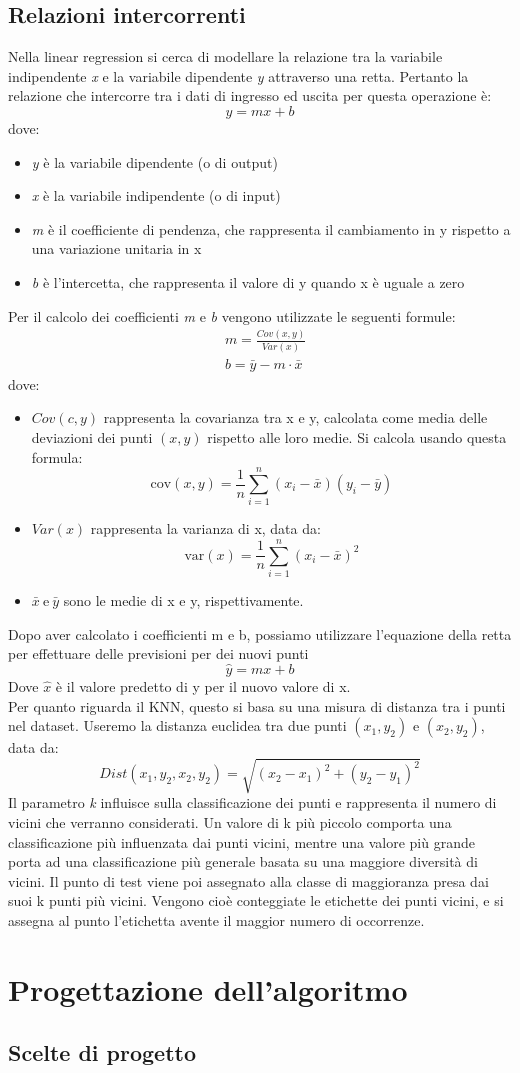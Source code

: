 \documentclass[11pt]{article}
\theoremstyle{definition}
\begin{document}
\subsection{Relazioni intercorrenti}
Nella linear regression si cerca di modellare la relazione tra la variabile indipendente \textit{x} e la variabile dipendente \textit{y} attraverso una retta. Pertanto la relazione che intercorre tra i dati di ingresso ed uscita per questa operazione è:
$$
y=mx+b
$$
dove:
\begin{itemize}
\item \textit{y} è la variabile dipendente (o di output)
\item \textit{x} è la variabile indipendente (o di input)
\item \textit{m} è il coefficiente di pendenza, che rappresenta il cambiamento in y rispetto a una variazione unitaria in x
\item \textit{b} è l'intercetta, che rappresenta il valore di y quando x è uguale a zero
\end{itemize}
Per il calcolo dei coefficienti \textit{m} e \textit{b} vengono utilizzate le seguenti formule:
\begin{align*}
&m = \frac{Cov(x,y)}{Var(x)}\\
&b=\bar{y}-m\cdot \bar{x}
\end{align*}
dove:
\begin{itemize}
\item $Cov(c,y)$ rappresenta la covarianza tra x e y, calcolata come media delle deviazioni dei punti $(x,y)$ rispetto alle loro medie. Si calcola usando questa formula:
$$
\text{cov}(x, y) = \frac{1}{n} \sum_{i=1}^{n} (x_i - \bar{x})(y_i - \bar{y})
$$
\item $Var(x)$ rappresenta la varianza di x, data da:
$$
\text{var}(x) = \frac{1}{n} \sum_{i=1}^{n} (x_i - \bar{x})^2
$$
\item $\bar{x} \ \text{e} \ \bar{y}$ sono le medie di x e y, rispettivamente.
\end{itemize}
Dopo aver calcolato i coefficienti m e b, possiamo utilizzare l'equazione della retta per effettuare delle previsioni per dei nuovi punti
$$
\hat{y} = mx+b
$$
Dove $\hat{x}$ è il valore predetto di y per il nuovo valore di x.\\
\newline
Per quanto riguarda il KNN, questo si basa su una misura di distanza tra i punti nel dataset. Useremo la distanza euclidea tra due punti $(x_1,y_2)$ e $(x_2,y_2)$, data da:
$$
Dist(x_1,y_2,x_2,y_2)=\sqrt{(x_2-x_1)^2 + (y_2-y_1)^2}
$$ 
Il parametro \textit{k} influisce sulla classificazione dei punti e rappresenta il numero di vicini che verranno considerati. Un valore di k più piccolo comporta una classificazione più influenzata dai punti vicini, mentre una valore più grande porta ad una classificazione più generale basata su una maggiore diversità di vicini. Il punto di test viene poi assegnato alla classe di maggioranza presa dai suoi k punti più vicini. Vengono cioè conteggiate le etichette dei punti vicini, e si assegna al punto l'etichetta avente il maggior numero di occorrenze.

\section{Progettazione dell'algoritmo}

\subsection{Scelte di progetto}
\end{document}
